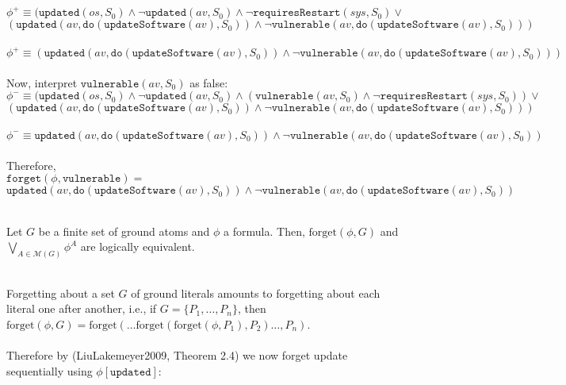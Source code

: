 \documentclass{assignment}
\begin{document}
\begin{problem}
\\
\(\phi^+\equiv(\texttt{updated}(os, S_0) \land \neg \texttt{updated}(av, S_0) \land  \neg \texttt{requiresRestart}(sys, S_0) \lor\)\\
\((\texttt{updated}(av, \texttt{do}(\texttt{updateSoftware}(av), S_0))\land \neg\texttt{vulnerable}(av, \texttt{do}(\texttt{updateSoftware}(av), S_0)))\)\\
\\
\(\phi^+\equiv(\texttt{updated}(av, \texttt{do}(\texttt{updateSoftware}(av), S_0))\land \neg\texttt{vulnerable}(av, \texttt{do}(\texttt{updateSoftware}(av), S_0)))\)\\
\\
Now, interpret $\texttt{vulnerable}(av, S_0)$ as false:\\
\(\phi^-\equiv(\texttt{updated}(os, S_0) \land \neg \texttt{updated}(av, S_0) \land (\texttt{vulnerable}(av, S_0)  \land  \neg \texttt{requiresRestart}(sys, S_0)) \lor\)\\
\((\texttt{updated}(av, \texttt{do}(\texttt{updateSoftware}(av), S_0))\land \neg\texttt{vulnerable}(av, \texttt{do}(\texttt{updateSoftware}(av), S_0)))\)\\
\\
\(\phi^-\equiv\texttt{updated}(av, \texttt{do}(\texttt{updateSoftware}(av), S_0))\land \neg\texttt{vulnerable}(av, \texttt{do}(\texttt{updateSoftware}(av), S_0))\)\\
\\
Therefore, \\
\(\texttt{forget}(\phi, \texttt{vulnerable}) =\)
\[ \texttt{updated}(av, \texttt{do}(\texttt{updateSoftware}(av), S_0))\land \neg\texttt{vulnerable}(av, \texttt{do}(\texttt{updateSoftware}(av), S_0))\]
\\
\begin{theorem}
Let \( G \) be a finite set of ground atoms and \( \phi \) a formula. Then, \( \text{forget}(\phi, G) \) and \( \bigvee_{A \in \mathcal{M}(G)} \phi^{A} \) are logically equivalent.
\end{theorem}
\\
Forgetting about a set \( G \) of ground literals amounts to forgetting about each literal one after another, i.e., if \( G = \{P_1, \ldots, P_n\} \), then \( \text{forget}(\phi, G) = \text{forget}(\ldots\text{forget}(\text{forget}(\phi, P_1), P_2)\ldots, P_n) \).
\\
\\
Therefore by (LiuLakemeyer2009, Theorem 2.4) we now forget update sequentially using $\phi[\texttt{updated}]$:\\

\end{problem}
\end{document}
